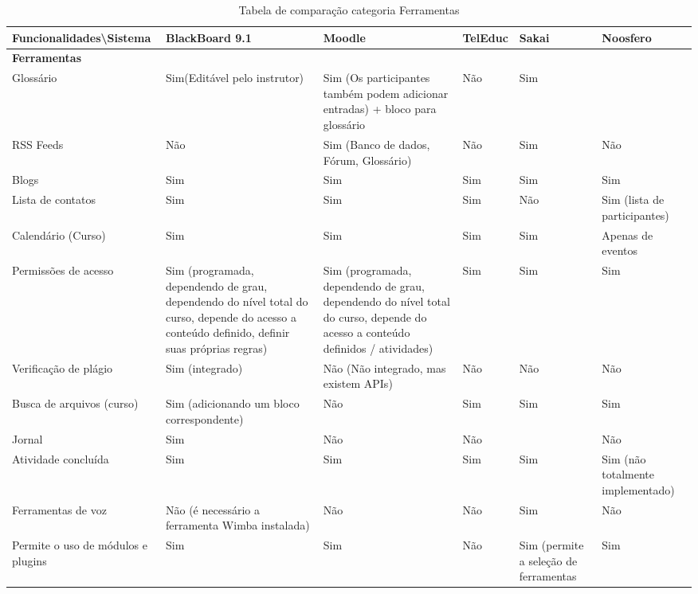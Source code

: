 \begin{landscape}
\begin{table}[H]
\begin{tabular}{|@{}p{5.5cm}|p{3.5cm}|p{3.5cm}|p{3.5cm}|p{3.5cm}|p{3.5cm}@{}|}
\hline
\textbf{Funcionalidades\textbackslash Sistema} & \textbf{BlackBoard 9.1} & \textbf{Moodle} & \textbf{TelEduc} & \textbf{Sakai} & \textbf{Noosfero}\\ \hline
\textbf{Ferramentas} &  &  &  &  &  \\
Glossário & Sim(Editável pelo instrutor) & Sim {\tiny (Os participantes também podem adicionar entradas) + bloco para glossário} & Não & Sim &  \\
RSS Feeds & Não & Sim {\tiny (Banco de dados, Fórum, Glossário)} & Não & Sim & Não \\
Blogs & Sim & Sim & Sim & Sim & Sim \\
Lista de contatos & Sim & Sim & Sim & Não & Sim {\tiny (lista de participantes)}\\
Calendário (Curso) & Sim & Sim & Sim & Sim & {\tiny Apenas de eventos} \\
Permissões de acesso & Sim {\tiny (programada, dependendo de grau, dependendo do nível total do curso, depende do acesso a conteúdo definido, definir suas próprias regras)} & Sim \tiny{(programada, dependendo de grau, dependendo do nível total do curso, depende do acesso a conteúdo definidos / atividades)} & Sim & Sim & Sim \\
Verificação de plágio & Sim {\tiny (integrado)} & Não {\tiny (Não integrado, mas existem APIs)} & Não & Não & Não \\
Busca de arquivos (curso) & Sim {\tiny (adicionando um bloco correspondente)} & Não & Sim & Sim & Sim \\
Jornal & Sim & Não & Não &  & Não \\
Atividade concluída & Sim & Sim & Sim & Sim & Sim {\tiny (não totalmente implementado)} \\
Ferramentas de voz & Não (é necessário a ferramenta Wimba instalada) & Não & Não & Sim & Não \\
Permite o uso de módulos e plugins & Sim & Sim & Não & Sim {\tiny (permite a seleção de ferramentas} & Sim \\ \hline
\end{tabular}
\caption{Tabela de comparação categoria Ferramentas}
\label{tab:ferramentas}
\end{table}


\end{landscape}
